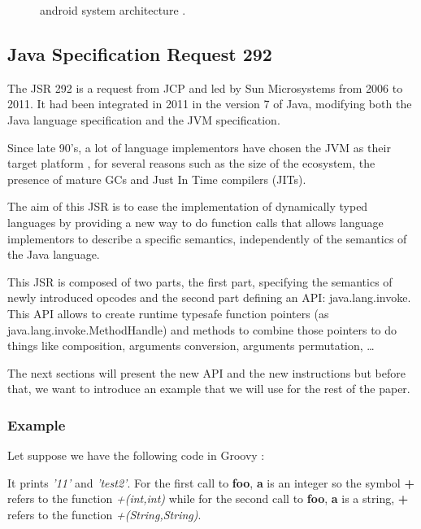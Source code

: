\documentclass{sig-alternate}
\def \JCP{JCP\xspace}
\def \SUN{Sun Microsystems\xspace}
\def \Jsr{JSR\xspace}
\def \JSR{\Jsr 292\xspace}
\def \JVM{JVM\xspace}
\begin{document}
    \begin{figure}[!h]
      \centering \resizebox{\linewidth}{!}{}
      \caption{android system architecture \cite{wiki-android}.}
      \label{ASA}
    \end{figure}

  \subsection{Java Specification Request 292}

    The \JSR is a request from \JCP and led by \SUN from 2006 to 2011.
    It had been integrated in 2011 in the version 7 of Java,
    modifying both the Java language specification and the \JVM specification.

    Since late 90's, a lot of language
    implementors have chosen the JVM as their target platform \cite{wiki-jvm-lang},
    for several reasons such as the size of the ecosystem,
    the presence of mature GCs and Just In Time compilers (JITs).

    The aim of this \Jsr is to ease the implementation of dynamically typed languages
    by providing a new way to do function calls that allows language implementors
    to describe a specific semantics, independently of the semantics of the Java language.

    This \Jsr is composed of two parts, the first part, specifying the semantics of
    newly introduced opcodes and the second part defining an API: java.lang.invoke.\\
    This API allows to create runtime typesafe function pointers (as java.lang.invoke.MethodHandle)
    and methods to combine those pointers to do things like composition, arguments conversion,
    arguments permutation, \dots

    The next sections will present the new API and the new instructions but before that,
    we want to introduce an example that we will use for the rest of the paper.

    \subsubsection{Example}
      Let suppose we have the following code in Groovy \cite{lang-groovy}:

      

      It prints {\it '11'} and {\it 'test2'}.
      For the first call to {\bf foo}, {\bf a} is an integer so the symbol {\bf +} refers
      to the function {\it +(int,int)} while for the second call to {\bf foo}, {\bf a} is a string, {\bf +} refers to the function {\it +(String,String)}.
\end{document}
